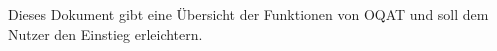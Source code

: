 







	


Dieses Dokument gibt eine Übersicht der Funktionen von OQAT und soll dem Nutzer den Einstieg erleichtern.

\tableofcontents	%












